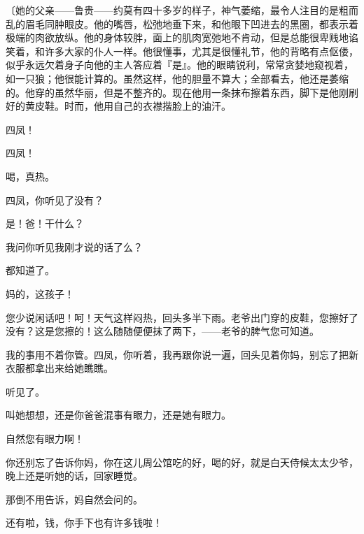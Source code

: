 {\fangsong〔她的父亲——鲁贵——约莫有四十多岁的样子，神气萎缩，最令人注目的是粗而乱的眉毛同肿眼皮。他的嘴唇，松弛地垂下来，和他眼下凹进去的黑圈，都表示着极端的肉欲放纵。他的身体较胖，面上的肌肉宽弛地不肯动，但是总能很卑贱地谄笑着，和许多大家的仆人一样。他很懂事，尤其是很懂礼节，他的背略有点伛偻，似乎永远欠着身子向他的主人答应着『是』。他的眼睛锐利，常常贪婪地窥视着，如一只狼；他很能计算的。虽然这样，他的胆量不算大；全部看去，他还是萎缩的。他穿的虽然华丽，但是不整齐的。现在他用一条抹布擦着东西，脚下是他刚刷好的黄皮鞋。时而，他用自己的衣襟揩脸上的油汗。}

四凤！


四凤！

喝，真热。

四凤，你听见了没有？

是！爸！干什么？

我问你听见我刚才说的话了么？

都知道了。

妈的，这孩子！

您少说闲话吧！呵！天气这样闷热，回头多半下雨。老爷出门穿的皮鞋，您擦好了没有？这是您擦的！这么随随便便抹了两下，——老爷的脾气您可知道。

我的事用不着你管。四凤，你听着，我再跟你说一遍，回头见着你妈，别忘了把新衣服都拿出来给她瞧瞧。

听见了。

叫她想想，还是你爸爸混事有眼力，还是她有眼力。

自然您有眼力啊！

你还别忘了告诉你妈，你在这儿周公馆吃的好，喝的好，就是白天侍候太太少爷，晚上还是听她的话，回家睡觉。

那倒不用告诉，妈自然会问的。

还有啦，钱，你手下也有许多钱啦！

